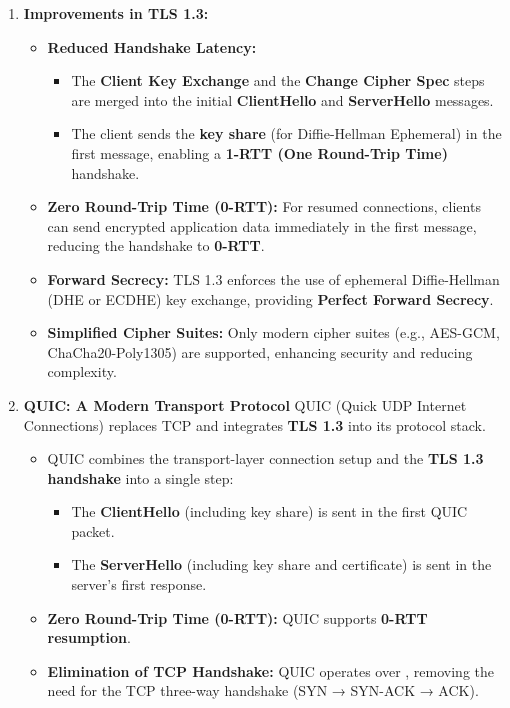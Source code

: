 \begin{Def}

    \label{def:tls13_quic}
    \begin{enumerate}
        \item \textbf{Improvements in TLS 1.3:}
        \begin{itemize}
            \item \textbf{Reduced Handshake Latency:} 
            \begin{itemize}
                \item The \textbf{Client Key Exchange} and the \textbf{Change Cipher Spec} steps are merged into the initial \textbf{ClientHello} and \textbf{ServerHello} messages.
                \item The client sends the \textbf{key share} (for Diffie-Hellman Ephemeral) in the first message, enabling a \textbf{1-RTT (One Round-Trip Time)} handshake.
            \end{itemize}
            \item \textbf{Zero Round-Trip Time (0-RTT):}
            For resumed connections, clients can send encrypted application data immediately in the first message, reducing the handshake to \textbf{0-RTT}.
            \item \textbf{Forward Secrecy:}
            TLS 1.3 enforces the use of ephemeral Diffie-Hellman (DHE or ECDHE) key exchange, providing \textbf{Perfect Forward Secrecy}.
            \item \textbf{Simplified Cipher Suites:}
            Only modern cipher suites (e.g., AES-GCM, ChaCha20-Poly1305) are supported, enhancing security and reducing complexity.
        \end{itemize}
        
        \item \textbf{QUIC: A Modern Transport Protocol}
        QUIC (Quick UDP Internet Connections) replaces TCP and integrates \textbf{TLS 1.3} into its protocol stack.
        \begin{itemize}
            \item QUIC combines the transport-layer connection setup and the \textbf{TLS 1.3 handshake} into a single step:
            \begin{itemize}
                \item The \textbf{ClientHello} (including key share) is sent in the first QUIC packet.
                \item The \textbf{ServerHello} (including key share and certificate) is sent in the server's first response.
            \end{itemize}
            \item \textbf{Zero Round-Trip Time (0-RTT):}
            QUIC supports \textbf{0-RTT resumption}.
            \item \textbf{Elimination of TCP Handshake:}
            QUIC operates over , removing the need for the TCP three-way handshake (SYN → SYN-ACK → ACK).
        \end{itemize}
    \end{enumerate}
    \end{Def}

